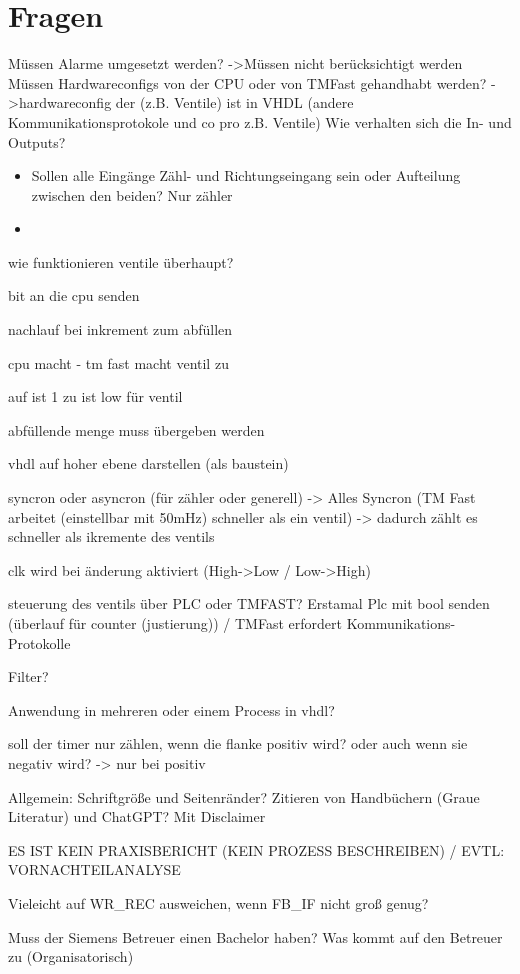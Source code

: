 \chapter{Fragen}
Müssen Alarme umgesetzt werden? ->Müssen nicht berücksichtigt werden
Müssen Hardwareconfigs von der CPU oder von TMFast gehandhabt werden? ->hardwareconfig der (z.B. Ventile) ist in VHDL (andere Kommunikationsprotokole und co pro z.B. Ventile)
Wie verhalten sich die In- und Outputs? 
\begin{itemize}
    \item Sollen alle Eingänge Zähl- und Richtungseingang sein oder Aufteilung zwischen den beiden? Nur zähler
    \item 
\end{itemize}

wie funktionieren ventile überhaupt?

bit an die cpu senden 

nachlauf bei inkrement zum abfüllen

cpu macht  - tm fast macht ventil zu

auf ist 1 zu ist low für ventil

abfüllende menge muss übergeben werden

vhdl auf hoher ebene darstellen (als baustein)

syncron oder asyncron (für zähler oder generell) -> Alles Syncron (TM Fast arbeitet (einstellbar mit 50mHz) schneller als ein ventil) -> dadurch zählt es schneller als ikremente des ventils

clk wird bei änderung aktiviert (High->Low / Low->High)

steuerung des ventils über PLC oder TMFAST? Erstamal Plc mit bool senden (überlauf für counter (justierung)) / TMFast erfordert Kommunikations-Protokolle

Filter?

Anwendung in mehreren oder einem Process in vhdl?

soll der timer nur zählen, wenn die flanke positiv wird? oder auch wenn sie negativ wird? -> nur bei positiv

Allgemein:
Schriftgröße und Seitenränder?
Zitieren von Handbüchern (Graue Literatur) und ChatGPT? Mit Disclaimer

ES IST KEIN PRAXISBERICHT (KEIN PROZESS BESCHREIBEN) / EVTL: VORNACHTEILANALYSE  

Vieleicht auf WR\_REC ausweichen, wenn FB\_IF nicht groß genug?

Muss der Siemens Betreuer einen Bachelor haben? Was kommt auf den Betreuer zu (Organisatorisch)

